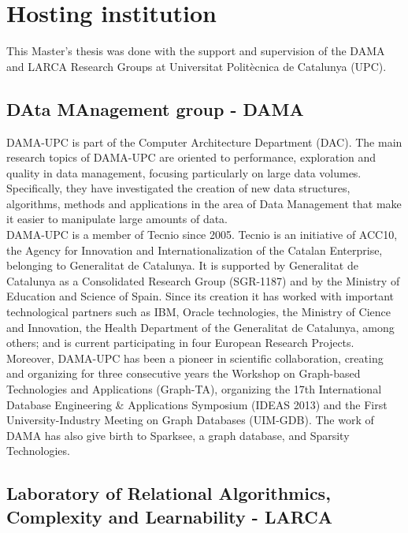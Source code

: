 \section*{Hosting institution}

This Master's thesis was done with the support and supervision of the DAMA and LARCA Research Groups at Universitat Polit\`ecnica de Catalunya (UPC). 

\subsection*{DAta MAnagement group - DAMA}

DAMA-UPC is part of the Computer Architecture Department (DAC). The main research topics of DAMA-UPC are oriented to performance, exploration and quality in data management, focusing particularly on large data volumes. Specifically, they have investigated the creation of new data structures, algorithms, methods and applications in the area of Data Management that make it easier to manipulate large amounts of data.\\

DAMA-UPC is a member of Tecnio since 2005. Tecnio is an initiative of ACC10, the Agency for Innovation and Internationalization of the Catalan Enterprise, belonging to Generalitat de Catalunya. It is supported by Generalitat de Catalunya as a Consolidated Research Group (SGR-1187) and by the Ministry of Education and Science of Spain. Since its creation it has worked with important technological partners such as IBM, Oracle technologies, the Ministry of Cience and Innovation, the Health Department of the Generalitat de Catalunya, among others; and is current participating in four European Research Projects. \\

Moreover, DAMA-UPC has been a pioneer in scientific collaboration, creating and organizing for three consecutive years the Workshop on Graph-based Technologies and Applications (Graph-TA), organizing the 17th International Database Engineering \& Applications Symposium (IDEAS 2013) and the First University-Industry Meeting on Graph Databases (UIM-GDB). The work of DAMA has also give birth to Sparksee, a graph database, and Sparsity Technologies.\\

\subsection*{Laboratory of Relational Algorithmics, Complexity and Learnability - LARCA}

